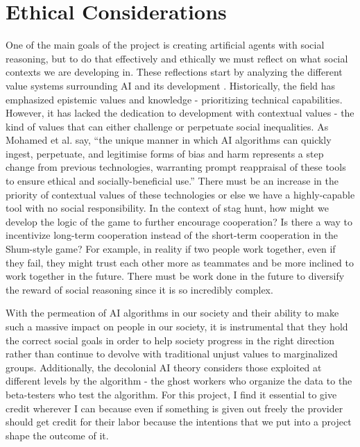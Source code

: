 \documentclass[10pt,twocolumn]{article}
\begin{document}
\section{Ethical Considerations}

One of the main goals of the project is creating artificial agents with social reasoning, but to do that effectively and ethically we must reflect on what social contexts we are developing in.
These reflections start by analyzing the different value systems surrounding AI and its development \cite{Mohamed2020}.
Historically, the field has emphasized epistemic values and knowledge - prioritizing technical capabilities.
However, it has lacked the dedication to development with contextual values - the kind of values that can either challenge or perpetuate social inequalities.
As Mohamed et al. say, “the unique manner in which AI algorithms can quickly ingest, perpetuate, and legitimise forms of bias and harm represents a step change from previous technologies, warranting prompt reappraisal of these tools to ensure ethical and socially-beneficial use.”
There must be an increase in the priority of contextual values of these technologies or else we have a highly-capable tool with no social responsibility.
In the context of stag hunt, how might we develop the logic of the game to further encourage cooperation?
Is there a way to incentivize long-term cooperation instead of the short-term cooperation in the Shum-style game?
For example, in reality if two people work together, even if they fail, they might trust each other more as teammates and be more inclined to work together in the future.
There must be work done in the future to diversify the reward of social reasoning since it is so incredibly complex.

With the permeation of AI algorithms in our society and their ability to make such a massive impact on people in our society, it is instrumental that they hold the correct social goals in order to help society progress in the right direction rather than continue to devolve with traditional unjust values to marginalized groups.
Additionally, the decolonial AI theory considers those exploited at different levels by the algorithm - the ghost workers who organize the data to the beta-testers who test the algorithm. 
For this project, I find it essential to give credit wherever I can because even if something is given out freely the provider should get credit for their labor because the intentions that we put into a project shape the outcome of it.
\end{document}
